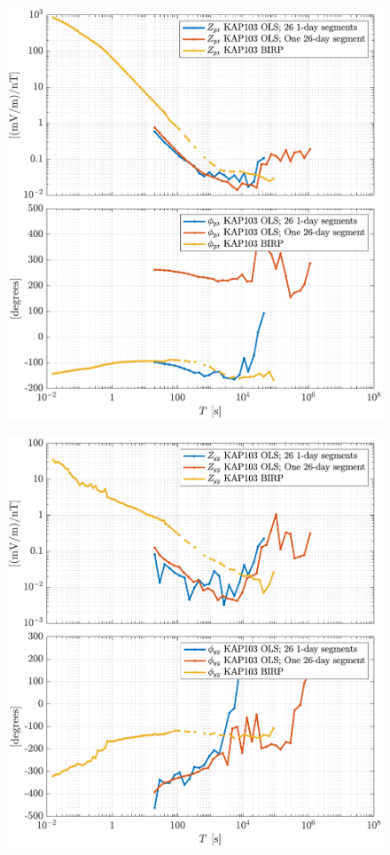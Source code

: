 \documentclass{article}
\begin{document}
\begin{figure}[h!]
\centering
\includegraphics[width=\textwidth]{figures/KAP103/transferfnZ_compare-Z_yx_Magnitude_Phase.pdf}
\caption{}
\label{fig:universe}
\end{figure}

\begin{figure}[h!]
\centering
\includegraphics[width=\textwidth]{figures/KAP103/transferfnZ_compare-Z_yy_Magnitude_Phase.pdf}
\caption{}
\label{fig:universe}
\end{figure}
\end{document}
